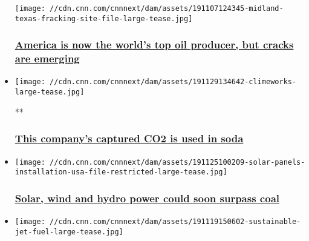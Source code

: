 \begin{itemize}
  \texttt{[image: //cdn.cnn.com/cnnnext/dam/assets/191107124345-midland-texas-fracking-site-file-large-tease.jpg]}

  \hypertarget{america-is-now-the-worlds-top-oil-producer-but-cracks-are-emerging}{%
  \subsubsection{\texorpdfstring{\href{/2019/11/07/business/america-number-one-oil-producer-now/index.html}{America
  is now the world's top oil producer, but cracks are
  emerging}}{America is now the world's top oil producer, but cracks are emerging}}\label{america-is-now-the-worlds-top-oil-producer-but-cracks-are-emerging}}
\item
  \href{/videos/business/2019/11/29/climeworks-carbon-capture-gec.cnn-business}{}

  \texttt{[image: //cdn.cnn.com/cnnnext/dam/assets/191129134642-climeworks-large-tease.jpg]}

  **

  \hypertarget{this-companys-captured-co2-is-used-in-soda}{%
  \subsubsection{\texorpdfstring{\href{/videos/business/2019/11/29/climeworks-carbon-capture-gec.cnn-business}{This
  company's captured CO2 is used in
  soda}}{This company's captured CO2 is used in soda}}\label{this-companys-captured-co2-is-used-in-soda}}
\item
  \href{/2019/11/26/business/renewable-energy-coal/index.html}{}

  \texttt{[image: //cdn.cnn.com/cnnnext/dam/assets/191125100209-solar-panels-installation-usa-file-restricted-large-tease.jpg]}

  \hypertarget{solar-wind-and-hydro-power-could-soon-surpass-coal}{%
  \subsubsection{\texorpdfstring{\href{/2019/11/26/business/renewable-energy-coal/index.html}{Solar,
  wind and hydro power could soon surpass
  coal}}{Solar, wind and hydro power could soon surpass coal}}\label{solar-wind-and-hydro-power-could-soon-surpass-coal}}
\item
  \href{/videos/business/2019/11/19/sustainable-jet-fuel-california-gec.cnn-business}{}

  \texttt{[image: //cdn.cnn.com/cnnnext/dam/assets/191119150602-sustainable-jet-fuel-large-tease.jpg]}


\end{itemize}
